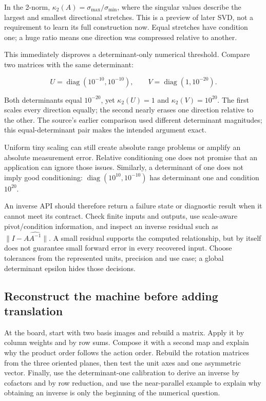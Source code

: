 In the 2-norm, \(\kappa_2(A)=\sigma_{\max}/\sigma_{\min}\), where the singular values describe the largest and smallest directional stretches. This is a preview of later SVD, not a requirement to learn its full construction now. Equal stretches have condition one; a huge ratio means one direction was compressed relative to another.

This immediately disproves a determinant-only numerical threshold. Compare two matrices with the same determinant:

\[
U=\operatorname{diag}(10^{-10},10^{-10}),\qquad
V=\operatorname{diag}(1,10^{-20}).
\]

Both determinants equal \(10^{-20}\), yet \(\kappa_2(U)=1\) and \(\kappa_2(V)=10^{20}\). The first scales every direction equally; the second nearly erases one direction relative to the other. The source's earlier comparison used different determinant magnitudes; this equal-determinant pair makes the intended argument exact.

Uniform tiny scaling can still create absolute range problems or amplify an absolute measurement error. Relative conditioning one does not promise that an application can ignore those issues. Similarly, a determinant of one does not imply good conditioning: \(\operatorname{diag}(10^{10},10^{-10})\) has determinant one and condition \(10^{20}\).

An inverse API should therefore return a failure state or diagnostic result when it cannot meet its contract. Check finite inputs and outputs, use scale-aware pivot/condition information, and inspect an inverse residual such as \(\|I-A\widehat{A^{-1}}\|\). A small residual supports the computed relationship, but by itself does not guarantee small forward error in every recovered input. Choose tolerances from the represented units, precision and use case; a global determinant epsilon hides those decisions.

\subsection{Reconstruct the machine before adding translation}\label{01-foundations-i-ch018-reconstruct-the-machine-before-adding-translation}

At the board, start with two basis images and rebuild a matrix. Apply it by column weights and by row sums. Compose it with a second map and explain why the product order follows the action order. Rebuild the rotation matrices from the three oriented planes, then test the unit axes and one asymmetric vector. Finally, use the determinant-one calibration to derive an inverse by cofactors and by row reduction, and use the near-parallel example to explain why obtaining an inverse is only the beginning of the numerical question.

